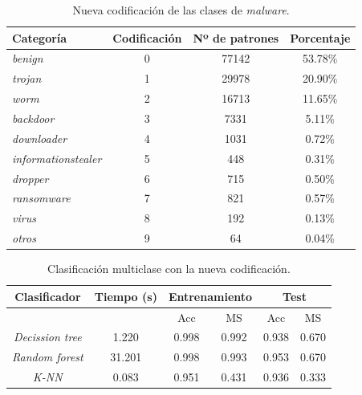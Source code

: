 \begin{table}[H]
	\centering
	\begin{tabular}{ |m{4cm}|c|c|c| }
		\hline
		\rowcolor{LightCyan}
		Categoría                   & Codificación & Nº de patrones & Porcentaje \\
		\hline
		\textit{benign}             & 0  & 77142 & 53.78\% \\
		\textit{trojan}             & 1  & 29978 & 20.90\% \\
		\textit{worm}               & 2  & 16713 & 11.65\% \\
		\textit{backdoor}           & 3  & 7331  & 5.11\% \\
		\textit{downloader}         & 4  & 1031  & 0.72\% \\
		\textit{informationstealer} & 5  & 448   & 0.31\% \\
		\textit{dropper}            & 6  & 715   & 0.50\% \\
		\textit{ransomware}         & 7  & 821   & 0.57\% \\
		\textit{virus}              & 8  & 192   & 0.13\% \\
		\textit{otros}              & 9  & 64    & 0.04\% \\
		\hline
	\end{tabular}
	\caption{Nueva codificación de las clases de \textit{malware}.}
	\label{tabla:nueva_codificacion_malware}
\end{table}

\begin{table}[H]
	\centering
	\begin{tabular}{ |c|c|c|c|c|c| }
		\hline
		\rowcolor{LightCyan}
		Clasificador & Tiempo (s) & \multicolumn{2}{c|}{Entrenamiento} & \multicolumn{2}{c|}{Test} \\
		\hline
		\rowcolor{LightCyan}
		&            & Acc & MS & Acc & MS \\
		\hline
		\textit{Decission tree} & 1.220  & 0.998 & 0.992 & 0.938 & 0.670 \\
		\textit{Random forest}  & 31.201 & 0.998 & 0.993 & 0.953 & 0.670 \\
		\textit{K-NN}           & 0.083  & 0.951 & 0.431 & 0.936 & 0.333 \\
		\hline
	\end{tabular}
	\caption{Clasificación multiclase con la nueva codificación.}
	\label{tabla:multi_new}
\end{table}

\vspace{1em}

